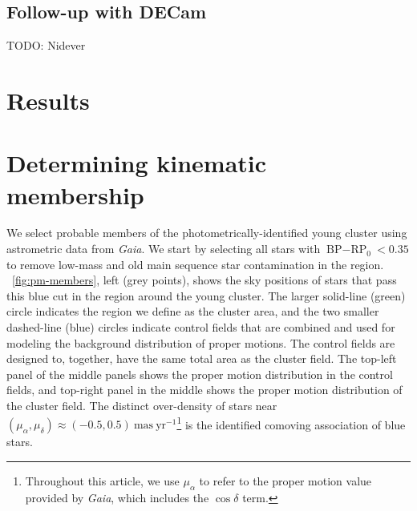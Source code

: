 \documentclass[modern]{aastex62}
\newcommand{\gaia}{\textsl{Gaia}}
\newcommand{\decam}{DECam}
\newcommand{\todo}[1]{{\color{red} TODO: #1}}
\newcommand{\masyr}{\ensuremath{\textrm{mas}~\textrm{yr}^{-1}}}
\newcommand{\hi}{H{\footnotesize I} }
\newcommand{\hie}{H{\footnotesize I}}
\newcommand{\bprp}{\ensuremath{\textrm{BP} - \textrm{RP}}}
\begin{document}
\subsection{Follow-up with \decam}
\label{sec:decam}

\todo{Nidever}



\section{Results} \label{sec:results}

\section{Determining kinematic membership}
\label{sec:pmclean}

We select probable members of the photometrically-identified young cluster using astrometric data from \gaia.
We start by selecting all stars with $\bprp_0 < 0.35$ to remove low-mass and old main sequence star contamination in the region.
\figurename~\ref{fig:pm-members}, left (grey points), shows the sky positions of stars that pass this blue cut in the region around the young cluster.
The larger solid-line (green) circle indicates the region we define as the cluster area, and the two smaller dashed-line (blue) circles indicate control fields that are combined and used for modeling the background distribution of proper motions.
The control fields are designed to, together, have the same total area as the cluster field.
The top-left panel of the middle panels shows the proper motion distribution in the control fields, and top-right panel in the middle shows the proper motion distribution of the cluster field.
The distinct over-density of stars near $(\mu_\alpha, \mu_\delta) \approx (-0.5, 0.5)~\masyr$\footnote{Throughout this article, we use $\mu_\alpha$ to refer to the proper motion value provided by \gaia, which includes the $\cos\delta$ term.} is the identified comoving association of blue stars.
\end{document}
